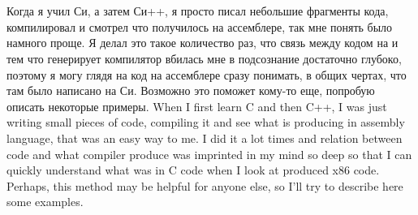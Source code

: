 ﻿\chapter{}

\IFRU
{Когда я учил Си, а затем Си++, я просто писал небольшие фрагменты кода, компилировал и смотрел что 
получилось на ассемблере, так мне понять было намного проще. Я делал это такое количество раз, 
что связь между кодом на \CCpp и тем что генерирует компилятор вбилась мне в подсознание достаточно 
глубоко, поэтому я могу глядя на код на ассемблере сразу понимать, в общих чертах, что там было написано 
на Си. Возможно это поможет кому-то еще, попробую описать некоторые примеры.}
{When I first learn C and then C++, I was just writing small pieces of code, compiling it and see what 
is producing in assembly language, that was an easy way to me. I did it a lot times and relation 
between \CCpp code and what compiler produce was imprinted in my mind so deep so that 
I can quickly understand what was in C code when I look at produced x86 code. 
Perhaps, this method may be helpful for anyone else, so I'll try to describe here some examples.}




























